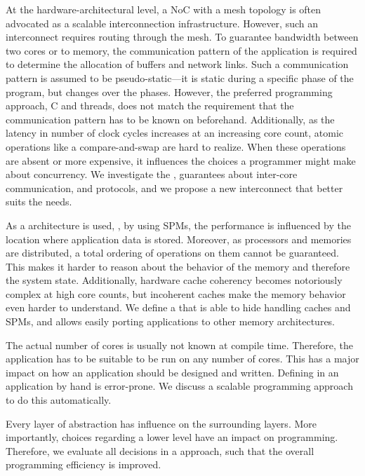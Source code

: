 At the hardware-architectural level, a \ac{NoC} with a mesh topology is often advocated as a scalable interconnection infrastructure.
However, such an interconnect requires routing through the mesh.
To guarantee bandwidth between two cores or to memory, the communication pattern of the application is required to determine the allocation of buffers and network links.
Such a communication pattern is assumed to be pseudo-static---it is static during a specific phase of the program, but changes over the phases.
However, the preferred programming approach, C and threads, does not match the requirement that the communication pattern has to be known on beforehand.
Additionally, as the latency in number of clock cycles increases at an increasing core count, atomic operations like a compare-and-swap are hard to realize.
When these operations are absent or more expensive, it influences the choices a programmer might make about concurrency.
We investigate the \emph{}, guarantees about inter-core communication, and \emph{} protocols, and we propose a new interconnect that better suits the needs.

As a  architecture is used, \eg, by using \aclp{SPM}, the performance is influenced by the location where application data is stored.
Moreover, as processors and memories are distributed, a total ordering of operations on them cannot be guaranteed.
This makes it harder to reason about the behavior of the memory and therefore the system state.
Additionally, hardware cache coherency becomes notoriously complex at high core counts, but incoherent caches make the memory behavior even harder to understand.
We define a \emph{} that is able to hide handling caches and \aclp{SPM}, and allows easily porting applications to other memory architectures.

The actual number of cores is usually not known at compile time.
Therefore, the application has to be suitable to be run on any number of cores.
This has a major impact on how an application should be designed and written.
Defining \emph{} in an application by hand is error-prone.
We discuss a scalable programming approach to do this automatically.

Every layer of abstraction has influence on the surrounding layers.
More importantly, choices regarding a lower level have an impact on programming.
Therefore, we evaluate all decisions in a \emph{\codesign*} approach, such that the overall programming efficiency is improved.


